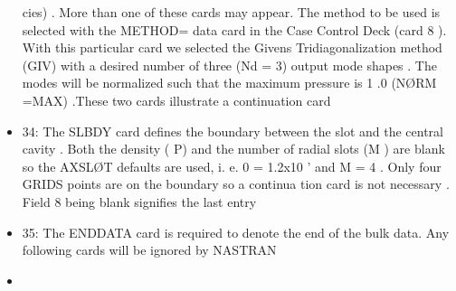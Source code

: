 \documentclass{article}
\begin{document}
\begin{itemize}
cies) . More than one of these cards may appear.
The method to be used is selected with
the METHOD= data card in the Case Control Deck (card 8 ). With this particular card we
selected the Givens Tridiagonalization method (GIV) with a desired number of three
(Nd = 3) output mode shapes . The modes will be normalized such that the maximum pressure
is 1 .0 (NØRM =MAX) .These two cards illustrate a continuation card
\item 34: The SLBDY card defines the boundary between the slot and the central cavity . Both the
density ( P) and the number of radial slots (M ) are blank so the AXSLØT defaults are used,
i. e. 0 = 1.2x10 ' and M = 4 . Only four GRIDS points are on the boundary so a continua
tion card is not necessary . Field 8 being blank signifies the last entry
\item 35: The ENDDATA card is required to denote the end of the bulk data. Any following cards will
be ignored by NASTRAN
\item
\end{itemize}
\end{document}
